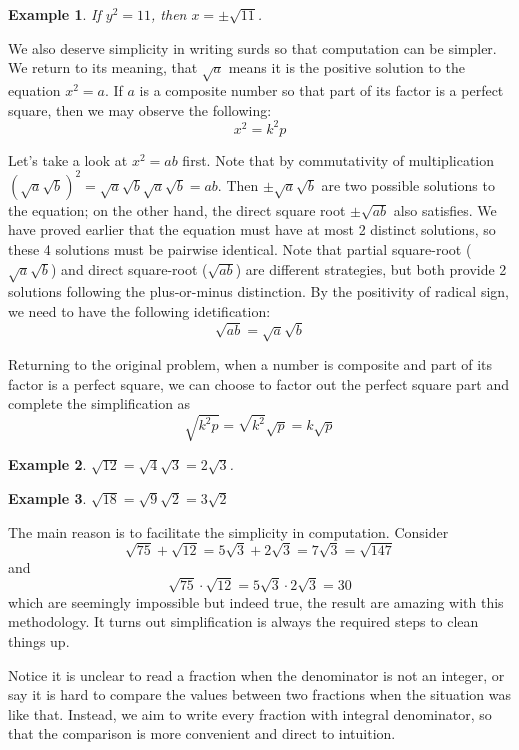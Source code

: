 \documentclass[12pt]{article}
\newtheorem*{example}{Example}
\begin{document}
    \begin{example}
        If $y^2=11$, then $x=\pm \sqrt{11}$.
    \end{example}

    We also deserve simplicity in writing surds so that computation can be simpler. We return to its meaning, that $\sqrt{a}$ means it is the positive solution to the equation $x^2=a$. If $a$ is a composite number so that part of its factor is a perfect square, then we may observe the following: $$x^2=k^2 p$$

    Let's take a look at $x^2=ab$ first. Note that by commutativity of multiplication $(\sqrt{a}\sqrt{b})^2=\sqrt{a}\sqrt{b}\sqrt{a}\sqrt{b}=ab$. Then $\pm\sqrt{a}\sqrt{b}$ are two possible solutions to the equation; on the other hand, the direct square root $\pm\sqrt{ab}$ also satisfies. We have proved earlier that the equation must have at most 2 distinct solutions, so these 4 solutions must be pairwise identical. Note that partial square-root ($\sqrt{a}\sqrt{b}$) and direct square-root ($\sqrt{ab}$) are different strategies, but both provide 2 solutions following the plus-or-minus distinction. By the positivity of radical sign, we need to have the following idetification: \[\sqrt{ab}=\sqrt{a}\sqrt{b}\]

    Returning to the original problem, when a number is composite and part of its factor is a perfect square, we can choose to factor out the perfect square part and complete the simplification as \[\sqrt{k^2 p}=\sqrt{k^2}\sqrt{p}=k\sqrt{p}\]

    \begin{example}
        $\sqrt{12}=\sqrt{4}\sqrt{3}=2\sqrt{3}$.
    \end{example}

    \begin{example}
        $\sqrt{18}=\sqrt{9}\sqrt{2}=3\sqrt{2}$
    \end{example}

    The main reason is to facilitate the simplicity in computation. Consider \[\sqrt{75}+\sqrt{12}=5\sqrt{3}+2\sqrt{3}=7\sqrt{3}=\sqrt{147}\] and \[\sqrt{75}\cdot \sqrt{12}=5\sqrt{3}\cdot 2\sqrt{3}=30\] which are seemingly impossible but indeed true, the result are amazing with this methodology. It turns out simplification is always the required steps to clean things up.

    Notice it is unclear to read a fraction when the denominator is not an integer, or say it is hard to compare the values between two fractions when the situation was like that. Instead, we aim to write every fraction with integral denominator, so that the comparison is more convenient and direct to intuition.
\end{document}
